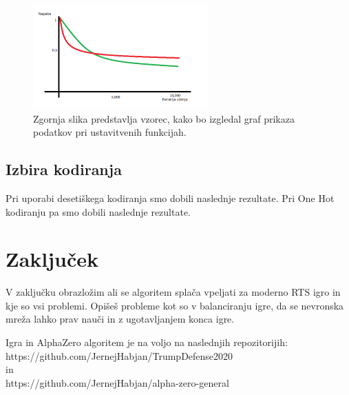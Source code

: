 \documentclass[a4paper, 12pt]{book}
\begin{document}
\begin{figure}[h]
	\begin{center}
		\includegraphics[width=0.6\textwidth]{vizualizacijaRezultatov.pdf}
	\end{center}
	\caption{Zgornja slika predstavlja vzorec, kako bo izgledal graf prikaza podatkov pri ustavitvenih funkcijah.}
	\label{vizualizacijaRezultatov}
\end{figure}


\section{Izbira kodiranja}
Pri uporabi desetiškega kodiranja smo dobili naslednje rezultate.
Pri One Hot kodiranju pa smo dobili naslednje rezultate.


\chapter{Zaključek}
\label{chzakljucek}
V zaključku obrazložim ali se algoritem splača vpeljati za moderno RTS igro in kje so vsi problemi.
Opišeš probleme kot so v balanciranju igre, da se nevronska mreža lahko prav nauči in z ugotavljanjem konca igre.

Igra in AlphaZero algoritem je na voljo na naslednjih repozitorijih:\\
https://github.com/JernejHabjan/TrumpDefense2020\\
in \\ 
https://github.com/JernejHabjan/alpha-zero-general


\newpage %
\ \\
\clearpage
{}


\end{document}
